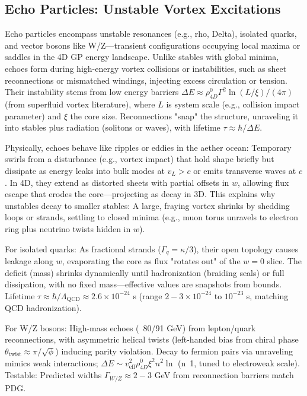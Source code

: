 \documentclass{article}
\begin{document}
\subsection{Echo Particles: Unstable Vortex Excitations}

Echo particles encompass unstable resonances (e.g., rho, Delta), isolated quarks, and vector bosons like W/Z—transient configurations occupying local maxima or saddles in the 4D GP energy landscape. Unlike stables with global minima, echoes form during high-energy vortex collisions or instabilities, such as sheet reconnections or mismatched windings, injecting excess circulation or tension. Their instability stems from low energy barriers $\Delta E \approx \rho_{4D}^0 \Gamma^2 \ln(L / \xi) / (4\pi)$ (from superfluid vortex literature), where $L$ is system scale (e.g., collision impact parameter) and $\xi$ the core size. Reconnections "snap" the structure, unraveling it into stables plus radiation (solitons or waves), with lifetime $\tau \approx \hbar / \Delta E$.

Physically, echoes behave like ripples or eddies in the aether ocean: Temporary swirls from a disturbance (e.g., vortex impact) that hold shape briefly but dissipate as energy leaks into bulk modes at $v_L > c$ or emits transverse waves at $c$. In 4D, they extend as distorted sheets with partial offsets in $w$, allowing flux escape that erodes the core—projecting as decay in 3D. This explains why unstables decay to smaller stables: A large, fraying vortex shrinks by shedding loops or strands, settling to closed minima (e.g., muon torus unravels to electron ring plus neutrino twists hidden in $w$).

For isolated quarks: As fractional strands ($\Gamma_q = \kappa / 3$), their open topology causes leakage along $w$, evaporating the core as flux "rotates out" of the $w=0$ slice. The deficit (mass) shrinks dynamically until hadronization (braiding seals) or full dissipation, with no fixed mass—effective values are snapshots from bounds. Lifetime $\tau \approx \hbar / \Lambda_{\text{QCD}} \approx 2.6 \times 10^{-24}$ s (range $2-3 \times 10^{-24}$ to $10^{-23}$ s, matching QCD hadronization).

For W/Z bosons: High-mass echoes (~80/91 GeV) from lepton/quark reconnections, with asymmetric helical twists (left-handed bias from chiral phase $\theta_{\text{twist}} \approx \pi / \sqrt{\phi}$) inducing parity violation. Decay to fermion pairs via unraveling mimics weak interactions; $\Delta E \sim v_{\text{eff}}^2 \rho_{4D}^0 \xi^2 n^2 \ln$ (n~1, tuned to electroweak scale). Testable: Predicted widths $\Gamma_{W/Z} \approx 2-3$ GeV from reconnection barriers match PDG.
\end{document}
